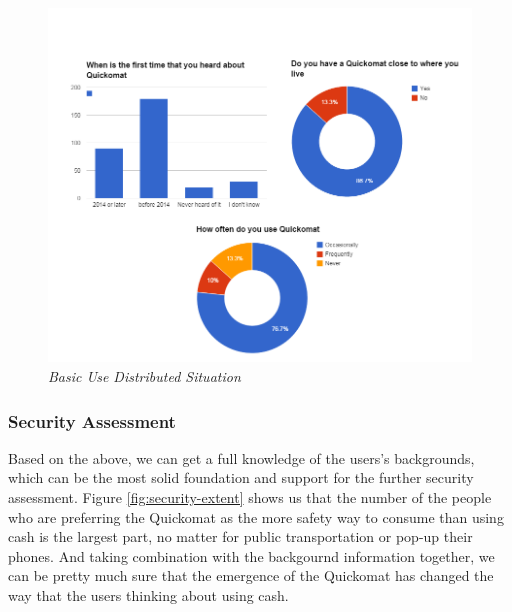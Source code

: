 \documentclass[twocolumn]{article}
\begin{document}
\begin{figure}
  \centering
  \includegraphics[width=\columnwidth]{fig/demographic-assessment2.png}
  \caption{\emph{Basic Use Distributed Situation}}
  \label{fig:demographic-assessment2}
\end{figure}

\subsubsection{Security Assessment}
Based on the above, we can get a full knowledge of the users's backgrounds, which can be the most solid foundation and support for the further security assessment. Figure \ref{fig:security-extent} shows us that the number of the people who are preferring the Quickomat as the more safety way to consume than using cash is the largest part, no matter for public transportation or pop-up their phones. And taking combination with the backgournd information together, we can be pretty much sure that the emergence of the Quickomat has changed the way that the users thinking about using cash.
\end{document}
